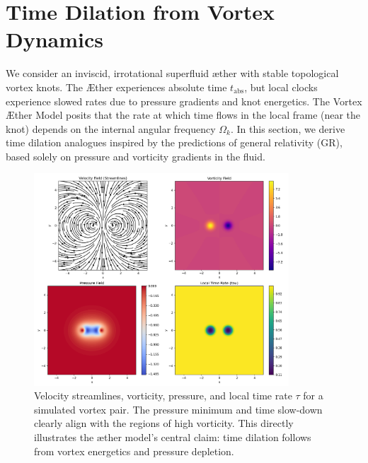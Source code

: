 
\section{Time Dilation from Vortex Dynamics}\label{sec:Part-1}
We consider an inviscid, irrotational superfluid æther with stable topological vortex knots. The Æther experiences absolute time $t_{\text{abs}}$, but local clocks experience slowed rates due to pressure gradients and knot energetics. The Vortex Æther Model posits that the rate at which time flows in the local frame (near the knot) depends on the internal angular frequency $\Omega_k$. In this section, we derive time dilation analogues inspired by the predictions of general relativity (GR), based solely on pressure and vorticity gradients in the fluid.

\begin{figure}[h!]
    \centering
    \includegraphics[width=0.85\textwidth]{export/streamlinesDiPole}
    \caption{Velocity streamlines, vorticity, pressure, and local time rate $\tau$ for a simulated vortex pair. The pressure minimum and time slow-down clearly align with the regions of high vorticity. This directly illustrates the æther model's central claim: time dilation follows from vortex energetics and pressure depletion.}
    \label{fig:vortexfields}
\end{figure}

